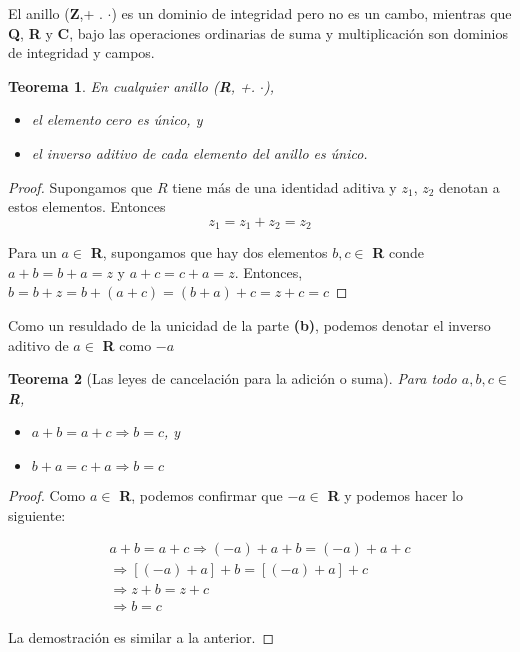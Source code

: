 \documentclass{llncs}
\theoremstyle{plane}
\newtheorem{teo}{Teorema}
\begin{document}
El anillo (\textbf{Z},+ . $\cdot$) es un dominio de integridad pero no es un cambo, mientras que \textbf{Q}, \textbf{R} y \textbf{C}, bajo las operaciones ordinarias de suma y multiplicación son dominios de integridad y campos.





\begin{teo}
En cualquier anillo (\textbf{R}, +. $\cdot$),

\begin{itemize}
\item [\textbf{a)}] el elemento $cero$ es único, y 
\item [\textbf{b)}] el inverso aditivo de cada elemento del anillo es único.
\end{itemize}
\end{teo}


\begin{proof}
\item [\textbf{a)}] Supongamos que $R$ tiene más de una identidad aditiva y $z_{1}$, $z_{2}$ denotan a estos elementos. Entonces
\[  z_{1} = z_{1}+z_{2}= z_{2} \]
\item [\textbf{b)}] Para un $a \in $ \textbf{R}, supongamos que hay dos elementos $b, c \in $ \textbf{R} conde $a+b= b+a=z$ y  $a+c= c+a=z$. Entonces, $b= b+z=b+(a+c)=(b+a)+c= z+c=c$ 
\end{proof}

Como un resuldado de la unicidad de la parte \textbf{(b)}, podemos denotar el inverso aditivo de $a \in $ \textbf{R} como $-a$

\begin{teo}[Las leyes de cancelación para la adición o suma]
Para todo $a, b, c \in$ \textbf{R},
\begin{itemize}
\item [\textbf{a)}] $a+b= a+c \Rightarrow b=c$, y
\item [\textbf{b)}] $b+a=c+a \Rightarrow b=c$
\end{itemize}
\end{teo}


\begin{proof}
\item [\textbf{a)}] Como $a \in $ \textbf{R}, podemos confirmar que $-a \in $ \textbf{R} y podemos hacer lo siguiente:

\begin{equation*}
\begin{aligned}
a+b = a+c  \Rightarrow  (-a)+ a+b =  (-a)+ a+c  \\   
\Rightarrow [(-a)+a]+b= [(-a)+a]+c \\
\Rightarrow z+b= z+c \\
\Rightarrow b= c
\end{aligned}
\end{equation*}

\item [\textbf{b)}] La demostración es similar a la anterior.
\end{proof}
\end{document}
